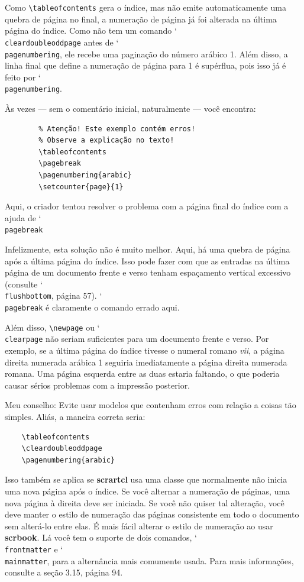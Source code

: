 Como \verb|\tableofcontents| gera o índice, mas não emite automaticamente uma quebra de página no final, a numeração de página já foi alterada na última página do índice. Como não tem um comando \char`\\\texttt{clear\-dou\-ble\-odd\-pa\-ge} antes de \char`\\\texttt{pa\-ge\-num\-be\-ring}, ele recebe uma paginação do número arábico 1. Além disso, a linha final que define a numeração de página para 1 é supérflua, pois isso já é feito por \char`\\\texttt{pa\-ge\-num\-be\-ring}.

Às vezes --- sem o comentário inicial, naturalmente --- você encontra:
\begin{verbatim}
        % Atenção! Este exemplo contém erros!
        % Observe a explicação no texto!
        \tableofcontents
        \pagebreak
        \pagenumbering{arabic}
        \setcounter{page}{1}
\end{verbatim}

Aqui, o criador tentou resolver o problema com a página final do índice com a ajuda de \char`\\\texttt{pa\-ge\-break}

Infelizmente, esta solução não é muito melhor. Aqui, há uma quebra de página após a última página do índice. Isso pode fazer com que as entradas na última página de um documento frente e verso tenham espaçamento vertical excessivo (consulte \char`\\\texttt{flush\-bot\-tom}, página 57). \char`\\\texttt{pa\-ge\-break} é claramente o comando errado aqui.

Além disso, \verb|\newpage| ou \char`\\\texttt{clear\-pa\-ge} não seriam suficientes para um documento frente e verso. Por exemplo, se a última página do índice tivesse o numeral romano \textit{vii}, a página direita numerada arábica 1 seguiria imediatamente a página direita numerada romana. Uma página esquerda entre as duas estaria faltando, o que poderia causar sérios problemas com a impressão posterior.

Meu conselho: Evite usar modelos que contenham erros com relação a coisas tão simples. Aliás, a maneira correta seria:
\begin{verbatim}
    \tableofcontents
    \cleardoubleoddpage
    \pagenumbering{arabic}
\end{verbatim}

Isso também se aplica se \textbf{scrartcl} usa uma classe que normalmente não inicia uma nova página após o índice. Se você alternar a numeração de páginas, uma nova página à direita deve ser iniciada. Se você não quiser tal alteração, você deve manter o estilo de numeração das páginas consistente em todo o documento sem alterá-lo entre elas. É mais fácil alterar o estilo de numeração ao usar \textbf{scrbook}. Lá você tem o suporte de dois comandos, \char`\\\texttt{front\-matter} e \char`\\\texttt{main\-matter}, para a alternância mais comumente usada. Para mais informações, consulte a seção 3.15, página 94.
